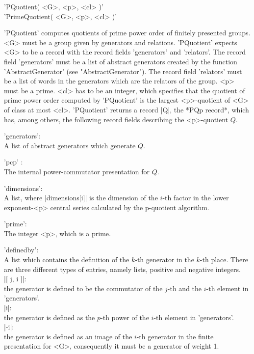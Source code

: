 'PQuotient( <G>, <p>, <cl> )'\\
'PrimeQuotient( <G>, <p>, <cl> )'

'PQuotient' computes quotients of prime power order of finitely presented
groups.   <G>  must  be  a  group  given  by  generators  and  relations.
'PQuotient'  expects  <G>  to  be  a  record   with  the  record   fields
'generators' and 'relators'. The record field 'generators' must be a list
of  abstract generators  created by the function 'AbstractGenerator' (see
"AbstractGenerator").   The record  field 'relators' must  be  a  list of
words in the generators which are the relators of the group.  <p> must be
a prime.  <cl> has to be an integer, which specifies that the quotient of
prime power order computed by  'PQuotient' is the largest <p>-quotient of
<G> of class at most <cl>.  'PQuotient' returns  a record |Q|,  the  *PQp
record*, which has, among others, the following  record fields describing
the <p>-quotient $Q$.

'generators':\\
        A list of abstract generators which  generate $Q$.

 'pcp' :\\
        The internal power-commutator presentation for $Q$.

'dimensions':\\
        A  list,  where |dimensions[i]|  is the  dimension of the  $i$-th
        factor in the lower exponent-<p> central series calculated by the
        p-quotient algorithm.

'prime':\\
        The integer <p>, which is a prime.

'definedby':\\
        A list which contains the  definition of the $k$-th  generator in
        the  $k$-th place. There are  three  different  types of entries,
        namely lists, positive and negative integers.\\
        |[ j, i ]|:\\
            the  generator is defined to be the commutator  of the $j$-th
            and the $i$-th element in 'generators'.\\
        |i|:\\
            the generator is defined as the  $p$-th  power of the  $i$-th
            element in 'generators'.\\
        |-i|:\\
            the  generator is defined as an image of the $i$-th generator
            in the finite presentation for <G>, consequently it must be a
            generator of weight 1.

